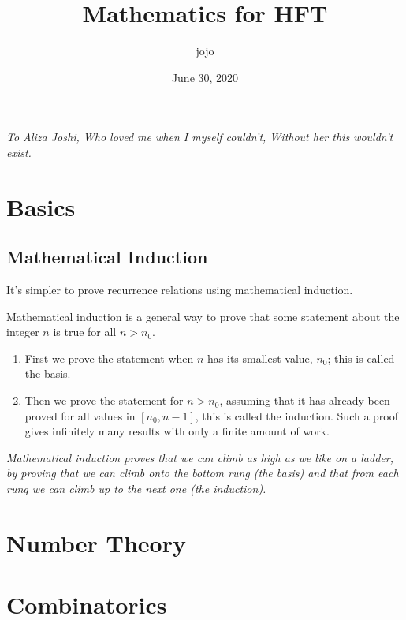 \documentclass[letterpaper,12pt]{report}
\theoremstyle{definition}
\theoremstyle{remark}
\begin{document}
\title{Mathematics for HFT}
\author{jojo}
\date{June 30, 2020}
\maketitle

\newpage
\vspace*{8cm}
\begin{center}
	\large \emph{
		To Aliza Joshi,\linebreak
		Who loved me when I myself couldn't,\linebreak
		Without her this wouldn't exist.}
\end{center}

\tableofcontents

\part{Basics}
\chapter {Mathematical Induction}
It's simpler to prove recurrence relations using mathematical induction.

Mathematical induction is a general way to prove that some statement about the integer $n$ is true for all $n > n_0$.
\begin{enumerate}
	\item First we prove the statement when $n$ has its smallest value, $n_0$; this is called the basis.
	\item Then we prove the statement for $n > n_0$, assuming that it has already been proved for all values in $ [n_0, n - 1]$, this is called the induction. Such a proof gives infinitely many results with only a finite amount of work.
\end{enumerate}

\textit{Mathematical induction proves that we can climb as high as we like on a ladder, by proving that we can climb onto the bottom rung (the basis) and that from each rung we can climb up to the next one (the induction).}



\part {Number Theory}
\part {Combinatorics}
\end{document}
